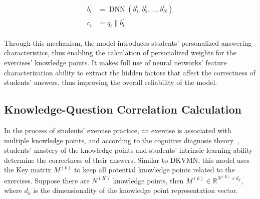\begin{align}\label{fml:ch3-sbcap}
    \begin{split}
        b^{\prime}_t &= \operatorname{DNN}(b_1^t,b_2^t,\ldots,b_N^t) \\
        c_t &= q_t\|b^{\prime}_t
    \end{split}
\end{align}

Through this mechanism, the model introduces students' personalized answering characteristics, thus enabling the calculation of personalized weights for the exercises' knowledge points. It makes full use of neural networks' feature characterization ability to extract the hidden factors that affect the correctness of students' answers, thus improving the overall reliability of the model.

\subsection{Knowledge-Question Correlation Calculation}

In the process of students' exercise practice, an exercise is associated with multiple knowledge points, and according to the cognitive diagnosis theory~\cite{chiu2018cognitive}, students' mastery of the knowledge points and students' intrinsic learning ability determine the correctness of their answers. Similar to DKVMN, this model uses the Key matrix \(M^{(k)}\) to keep all potential knowledge points related to the exercises. Suppose there are \(N^{(K)}\) knowledge points, then \(M^{(k)}\in\mathbb{R}^{{N^{(K)}}\times d_k}\), where \(d_k\) is the dimensionality of the knowledge point representation vector.


